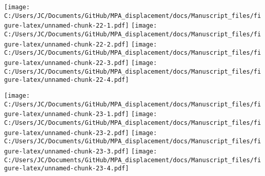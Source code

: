 \documentclass[11pt,]{article}
\begin{document}
\texttt{[image: C:/Users/JC/Documents/GitHub/MPA\_displacement/docs/Manuscript\_files/figure-latex/unnamed-chunk-22-1.pdf]}
\texttt{[image: C:/Users/JC/Documents/GitHub/MPA\_displacement/docs/Manuscript\_files/figure-latex/unnamed-chunk-22-2.pdf]}
\texttt{[image: C:/Users/JC/Documents/GitHub/MPA\_displacement/docs/Manuscript\_files/figure-latex/unnamed-chunk-22-3.pdf]}
\texttt{[image: C:/Users/JC/Documents/GitHub/MPA\_displacement/docs/Manuscript\_files/figure-latex/unnamed-chunk-22-4.pdf]}

\texttt{[image: C:/Users/JC/Documents/GitHub/MPA\_displacement/docs/Manuscript\_files/figure-latex/unnamed-chunk-23-1.pdf]}
\texttt{[image: C:/Users/JC/Documents/GitHub/MPA\_displacement/docs/Manuscript\_files/figure-latex/unnamed-chunk-23-2.pdf]}
\texttt{[image: C:/Users/JC/Documents/GitHub/MPA\_displacement/docs/Manuscript\_files/figure-latex/unnamed-chunk-23-3.pdf]}
\texttt{[image: C:/Users/JC/Documents/GitHub/MPA\_displacement/docs/Manuscript\_files/figure-latex/unnamed-chunk-23-4.pdf]}

\clearpage


\end{document}
